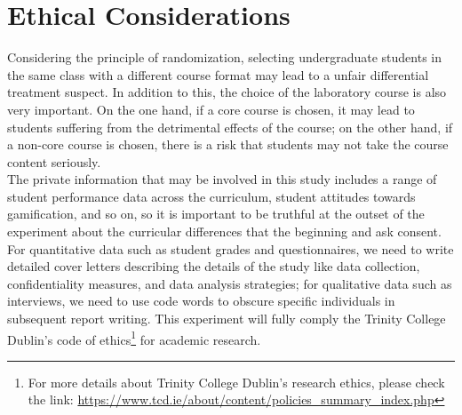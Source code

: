 \documentclass[12pt]{article} %
\begin{document}
\section*{Ethical Considerations}
\noindent Considering the principle of randomization, selecting undergraduate students in the same class with a different course format may lead to a unfair differential treatment suspect. In addition to this, the choice of the laboratory course is also very important. On the one hand, if a core course is chosen, it may lead to students suffering from the detrimental effects of the course; on the other hand, if a non-core course is chosen, there is a risk that students may not take the course content seriously.\\

\noindent The private information that may be involved in this study includes a range of student performance data across the curriculum, student attitudes towards gamification, and so on, so it is important to be truthful at the outset of the experiment about the curricular differences that the beginning and ask consent. For quantitative data such as student grades and questionnaires, we need to write detailed cover letters describing the details of the study like data collection, confidentiality measures, and data analysis strategies; for qualitative data such as interviews, we need to use code words to obscure specific individuals in subsequent report writing. This experiment will fully comply the Trinity College Dublin's code of ethics\footnote{For more details about Trinity College Dublin's research ethics, please check the link:  \url{https://www.tcd.ie/about/content/policies_summary_index.php}} for academic research.\\
\newpage


\end{document}
